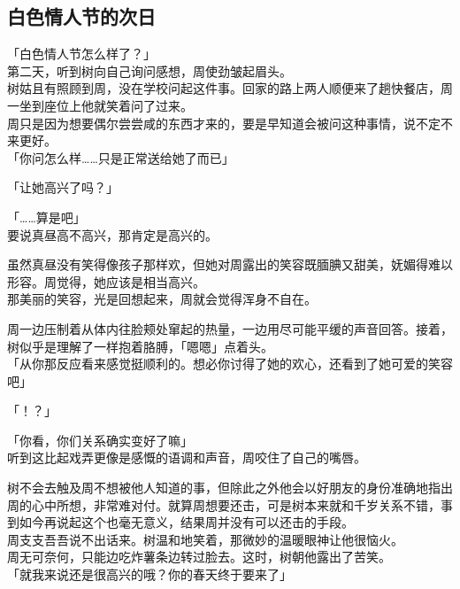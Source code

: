 \subsection{白色情人节的次日}

「白色情人节怎么样了？」\\

第二天，听到树向自己询问感想，周使劲皱起眉头。\\

树姑且有照顾到周，没在学校问起这件事。回家的路上两人顺便来了趟快餐店，周一坐到座位上他就笑着问了过来。\\

周只是因为想要偶尔尝尝咸的东西才来的，要是早知道会被问这种事情，说不定不来更好。\\

「你问怎么样……只是正常送给她了而已」

「让她高兴了吗？」

「……算是吧」\\

要说真昼高不高兴，那肯定是高兴的。

虽然真昼没有笑得像孩子那样欢，但她对周露出的笑容既腼腆又甜美，妩媚得难以形容。周觉得，她应该是相当高兴。\\

那美丽的笑容，光是回想起来，周就会觉得浑身不自在。

周一边压制着从体内往脸颊处窜起的热量，一边用尽可能平缓的声音回答。接着，树似乎是理解了一样抱着胳膊，「嗯嗯」点着头。\\

「从你那反应看来感觉挺顺利的。想必你讨得了她的欢心，还看到了她可爱的笑容吧」

「！？」

「你看，你们关系确实变好了嘛」\\

听到这比起戏弄更像是感慨的语调和声音，周咬住了自己的嘴唇。

树不会去触及周不想被他人知道的事，但除此之外他会以好朋友的身份准确地指出周的心中所想，非常难对付。就算周想要还击，可是树本来就和千岁关系不错，事到如今再说起这个也毫无意义，结果周并没有可以还击的手段。\\

周支支吾吾说不出话来。树温和地笑着，那微妙的温暖眼神让他很恼火。\\

周无可奈何，只能边吃炸薯条边转过脸去。这时，树朝他露出了苦笑。\\

「就我来说还是很高兴的哦？你的春天终于要来了」

